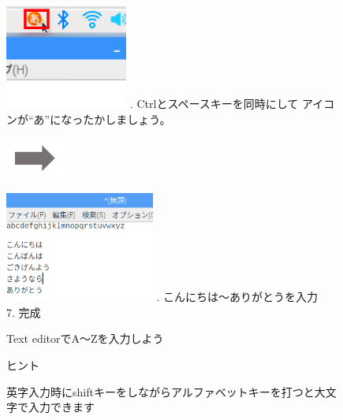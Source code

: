 \documentclass[a4paper,12pt]{jarticle}
\begin{document}
\begin{figure}[ht]
  \begin{minipage}{6.73cm}
    \includegraphics[width=4.029cm]{textbook-img062.png}
    . Ctrlとスペースキーを同時にして
    アイコンが“あ”になったかしましょう。
  \end{minipage}
  \includegraphics[width=1.919cm]{textbook-img053.png}
  \begin{minipage}{6.589cm}
    \includegraphics[width=4.914cm]{textbook-img060.png}
    . こんにちは〜ありがとうを入力\\
    7. 完成
  \end{minipage}



  \flushleft
  \theQuestion\label{Q:hasAnswer02-4}
  Text editorでA〜Zを入力しよう

  ヒント

  英字入力時にshiftキーをしながらアルファベットキーを打つと大文字で入力できます
\end{figure}
\clearpage
\end{document}
